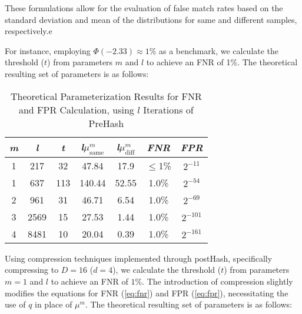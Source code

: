
These formulations allow for the evaluation of false match rates based on the standard deviation and mean of the distributions for same and different samples, respectively.e

For instance, employing \(\Phi(-2.33) \approx 1\%\) as a benchmark, we calculate the threshold (\(t\)) from parameters \(m\) and \(l\) to achieve an FNR of 1\%. The theoretical resulting set of parameters is as follows: 

\begin{table}[htbp] 
    \centering
    \begin{tabular}{|c|c|c|c|c|c|c|}
        \hline
        \textit{m} & \textit{l} & \textit{t} & \textit{l}\(\mu_{\text{same}}^m\) & \textit{l}\(\mu_{\text{diff}}^m\) & \textit{FNR} & \textit{FPR} \\
        \hline
        1 & 217 & 32 & 47.84 & 17.9 & \(\leq\)1\% & \(2^{-11}\)\\
        1 & 637 & 113 & 140.44 & 52.55 & 1.0\% & \(2^{-54}\) \\
        2 & 961 & 31 & 46.71 & 6.54 & 1.0\% & \(2^{-69}\) \\
        3 & 2569 & 15 & 27.53 & 1.44 & 1.0\% &\(2^{-101}\) \\
        4 & 8481 & 10 & 20.04 & 0.39 & 1.0\% & \(2^{-161}\) \\
        \hline
    \end{tabular}
    \caption{Theoretical Parameterization Results for FNR and FPR Calculation, using $l$ Iterations of PreHash}
    \label{tab:theoretical_parameterization_PreHash}
\end{table}

Using compression techniques implemented through postHash, specifically compressing to \( D = 16 \) (\( d = 4 \)), we calculate the threshold (\( t \)) from parameters \( m = 1 \) and \( l \) to achieve an FNR of \(1\%\). The introduction of compression slightly modifies the equations for FNR (\ref{eq:fnr}) and FPR (\ref{eq:fpr}), necessitating the use of \( q \) in place of \(\mu^m\). The theoretical resulting set of parameters is as follows:

